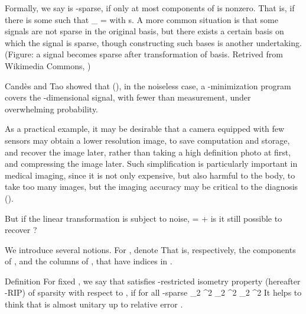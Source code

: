 Formally, we say  is -sparse, if only at most  components of  is nonzero.
That is, if there is some  such that
%
 {
\NC {} _{}
=\NC {} \NR
}
%
with
%
 {
\NC {} \leq \NC s. \NR
}
A more common situation is that some signals are not sparse in the original basis, but there exists a certain basis on which the signal is sparse, though constructing such bases is another undertaking.
(Figure: a signal becomes sparse after transformation of basis.
Retrived from Wikimedia Commons, )

Candès and Tao showed that (), in the noiseless case, a -minimization program covers the -dimensional signal, with fewer than  measurement, under overwhelming probability.

As a practical example, it may be desirable that a camera equipped with few sensors may obtain a lower resolution image, to save computation and storage, and recover the image later, rather than taking a high definition photo at first, and compressing the image later.
Such simplification is particularly important in medical imaging, since it is not only expensive, but also harmful to the body, to take too many images, but the imaging accuracy may be critical to the diagnosis ().

\stopsection

\startsection [title={The Dantzig Selector}]

But if the linear transformation is subject to noise,
%
 {
\NC {}
=\NC {}  +  \NR
}
is it still possible to recover ?

We introduce several notions.
For , denote
%
%
That is, respectively, the components of , and the columns of , that have indices in .


\Result
{Definition}
{
For fixed , we say that  satisfies -restricted isometry property (hereafter -RIP) of sparsity  with respect to , if for all -sparse 
%
 {
\NC {}  _2 ^2
\leq \NC {} _2 ^2 \NR
%
\NC \leq \NC {}  _2 ^2 \NR
}
}
%
It helps to think that  is almost unitary up to relative error .

